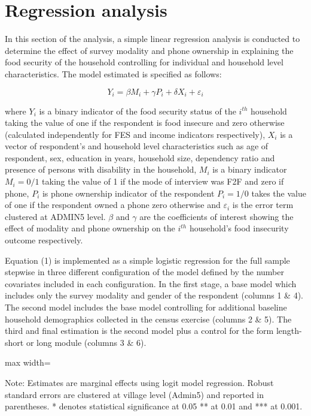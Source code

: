 \documentclass[11pt,harvard]{article}
\begin{document}
	
	\section{Regression analysis}
	
	In this section of the analysis, a simple linear regression analysis is conducted to determine the effect of survey modality and phone ownership in explaining the food security of the household controlling for individual and household level characteristics. The model estimated is specified as follows:
	
	\[Y_{i}=\beta M_{i}+ \gamma P_{i}+ \delta X_{i}+ \varepsilon_{i} \tag{1}\] 
	
	where \(Y_{i}\) is a binary indicator of the food security status of the \(i^{th}\) household taking the value of one if the respondent is food insecure
	and zero otherwise (calculated independently for FES and income indicators respectively), \(X_{i}\) is a vector of respondent's and household level characteristics such as age of respondent, sex, education in years, household size, dependency ratio and presence of persons with disability in the household, \(M_{i}\) is a binary indicator \(M_{i}=0/1\) taking the value of 1 if the mode of interview was F2F and zero if  phone, \(P_{i}\) is phone ownership indicator of the respondent \(P_{i}=1/0\) takes the value of one if the respondent owned a phone zero otherwise and \(\varepsilon_{i}\) is the error term clustered at ADMIN5 level. \(\beta\) and \(\gamma\) are the coefficients of interest showing the effect of modality and phone ownership on the \(i^{th}\) household's food insecurity outcome respectively.
	
	Equation (1) is implemented as a simple logistic regression for the full sample stepwise in three different configuration of the model defined by the number covariates included in each configuration. In the first stage, a base model which includes only the survey modality and gender of the respondent (columns 1 \& 4). The second model includes the base model controlling for additional baseline household demographics collected in the census exercise (columns 2 \& 5). The third and final estimation is the second model plus a control for the form length- short or long module (columns 3 \& 6).
	
	\begin{table}[htbp]
		\centering
			\begin{adjustbox}{max width=\textwidth}
				\begin{threeparttable}
			\caption{Logit Regression on Food Security based Outcomes}
			\small
			 
			\label{tab:BF_FS_Logit}
			\begin{tablenotes}
				\item Note: Estimates are marginal effects using logit model regression. Robust standard errors are clustered at village level (Admin5) and reported in parentheses. * denotes statistical significance at 0.05 ** at 0.01 and *** at 0.001.
			\end{tablenotes}
				\end{threeparttable}
			\end{adjustbox}
	\end{table}
	
\end{document}
